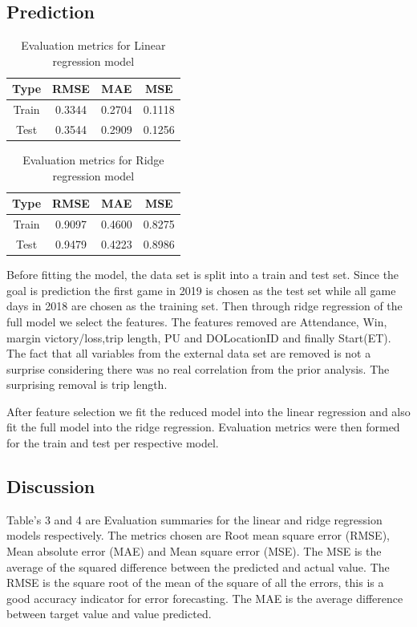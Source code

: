 \documentclass[11pt]{article}
\begin{document}
\subsection{Prediction}
\begin{table}[h]
\centering
\begin{tabular}{||c c c c ||} 
 \hline
 Type & RMSE & MAE & MSE  \\ [0.5ex] 
 \hline\hline
 Train & 0.3344 & 0.2704 & 0.1118 \\ 
 \hline
 Test & 0.3544 &  0.2909 & 0.1256 \\
 \hline
\end{tabular}
\caption{Evaluation metrics for Linear regression model}
\end{table}

\begin{table}[h]
\centering
\begin{tabular}{||c c c c ||} 
 \hline
 Type & RMSE & MAE & MSE  \\ [0.5ex] 
 \hline\hline
 Train & 0.9097 & 0.4600 & 0.8275 \\ 
 \hline
 Test &  0.9479 &  0.4223 & 0.8986 \\
 \hline
\end{tabular}
\caption{Evaluation metrics for Ridge regression model}
\end{table}
Before fitting the model, the data set is split into a train and test set. Since the goal is prediction the first game in 2019 is chosen as the test set while all game days in 2018 are chosen as the training set. Then through ridge regression of the full model we select the features. The features removed are Attendance, Win, margin victory/loss,trip length, PU and DOLocationID and finally Start(ET). The fact that all variables from the external data set are removed is not a surprise considering there was no real correlation from the prior analysis. The surprising removal is trip length.

After feature selection we fit the reduced model into the linear regression and also fit the full model into the ridge regression. Evaluation metrics were then formed for the train and test per respective model.

\subsection{Discussion}
Table's 3 and 4 are Evaluation summaries for the linear and ridge regression models respectively. The metrics chosen are Root mean square error (RMSE), Mean absolute error (MAE) and Mean square error (MSE). The MSE is the average of the squared difference between the predicted and actual value. The RMSE is the square root of the mean of the square of all the errors, this is a good accuracy indicator for error forecasting. The MAE is the average difference between target value and value predicted. 
\end{document}
